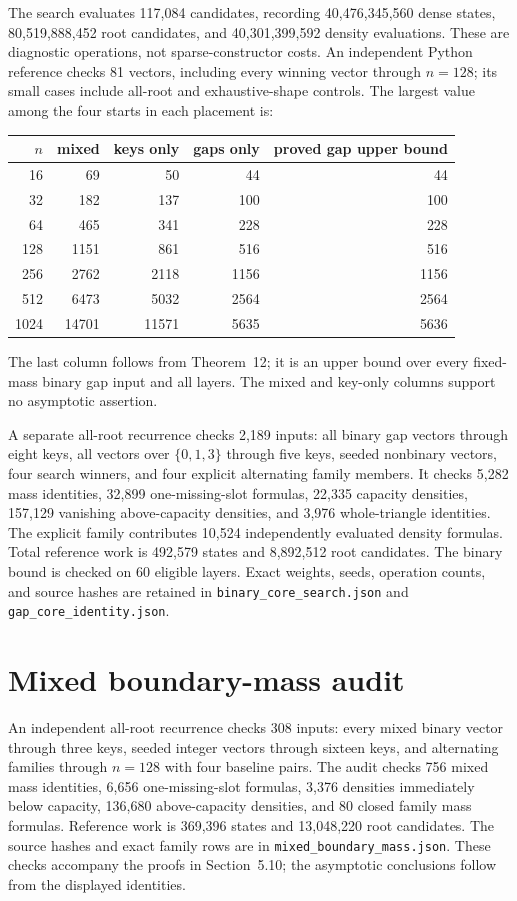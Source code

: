 \documentclass[11pt]{article}
\begin{document}
The search evaluates 117,084 candidates, recording 40,476,345,560 dense
states, 80,519,888,452 root candidates, and 40,301,399,592 density evaluations.
These are diagnostic operations, not sparse-constructor costs. An independent
Python reference checks 81 vectors, including every winning vector through
$n=128$; its small cases include all-root and exhaustive-shape controls.
The largest value among the four starts in each placement is:
\begin{center}
\begin{tabular}{rrrrr}
\toprule
$n$ & mixed & keys only & gaps only & proved gap upper bound\\
\midrule
16 & 69 & 50 & 44 & 44\\
32 & 182 & 137 & 100 & 100\\
64 & 465 & 341 & 228 & 228\\
128 & 1151 & 861 & 516 & 516\\
256 & 2762 & 2118 & 1156 & 1156\\
512 & 6473 & 5032 & 2564 & 2564\\
1024 & 14701 & 11571 & 5635 & 5636\\
\bottomrule
\end{tabular}
\end{center}
The last column follows from Theorem~12; it is
an upper bound over every fixed-mass binary gap input and all layers.
The mixed and key-only columns support no asymptotic assertion.

A separate all-root recurrence checks 2,189 inputs: all binary gap vectors
through eight keys, all vectors over $\{0,1,3\}$ through five keys,
seeded nonbinary vectors, four search winners, and four explicit alternating
family members. It checks 5,282 mass identities, 32,899 one-missing-slot
formulas, 22,335 capacity densities, 157,129 vanishing above-capacity
densities, and 3,976 whole-triangle identities. The explicit family contributes
10,524 independently evaluated density formulas. Total reference work is
492,579 states and 8,892,512 root candidates. The binary bound is checked
on 60 eligible layers. Exact weights, seeds, operation counts, and source
hashes are retained in \texttt{binary\_core\_search.json} and
\texttt{gap\_core\_identity.json}.

\section{Mixed boundary-mass audit}
\label{app:mixed-boundary-mass}
An independent all-root recurrence checks 308 inputs: every mixed binary
vector through three keys, seeded integer vectors through sixteen keys,
and alternating families through $n=128$ with four baseline pairs.
The audit checks 756 mixed mass identities, 6,656 one-missing-slot formulas,
3,376 densities immediately below capacity, 136,680 above-capacity densities,
and 80 closed family mass formulas. Reference work is 369,396 states and
13,048,220 root candidates. The source hashes and exact family rows are in
\texttt{mixed\_boundary\_mass.json}. These checks accompany the proofs in
Section~5.10; the asymptotic conclusions follow
from the displayed identities.
\end{document}
